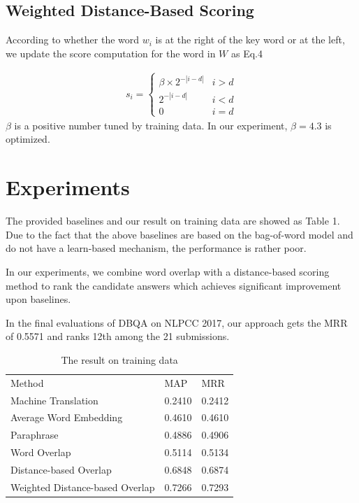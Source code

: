 \documentclass{llncs}
\begin{document}
\subsection{Weighted Distance-Based Scoring}

According to whether the word $w_i$ is at the right of the key word or at the left, we update the score computation for the word in $W$ as Eq.4  

  \begin{equation}
  \begin{aligned}
    s_i = \begin{cases} \beta \times 2^{-|i-d|} & i > d \\
     2^{-|i-d|} & i < d \\
     0 & i = d
     \end{cases}
  \end{aligned}
  \end{equation}
$\beta$ is a positive number tuned by training data. In our experiment, $\beta = 4.3$ is optimized.

\section{Experiments}
The provided baselines and our result on training data are showed as Table 1. 
Due to the fact that the above baselines are based on the bag-of-word model
and do not have a learn-based mechanism, the performance is rather poor. 

In our experiments, we combine word
overlap with a distance-based scoring method to rank the candidate answers 
which achieves significant improvement upon baselines.

In the final evaluations of DBQA on NLPCC 2017, our approach gets the MRR of 
0.5571 and ranks 12th among the 21 submissions.
\begin{table}
\centering
\caption{The result on training data}
\begin{tabular}{l@{\qquad}l@{\qquad}l}
\hline\noalign{\smallskip}
Method & MAP & MRR\\
\noalign{\smallskip}
\hline
\noalign{\smallskip}
Machine Translation     & 0.2410 & 0.2412  \\
Average Word Embedding  & 0.4610 & 0.4610  \\
Paraphrase              & 0.4886 & 0.4906  \\
Word Overlap            & 0.5114 & 0.5134  \\
\hline
Distance-based Overlap  & 0.6848 & 0.6874  \\
Weighted Distance-based Overlap   & 0.7266 & 0.7293  \\
\hline
\end{tabular}
\end{table}
\end{document}
